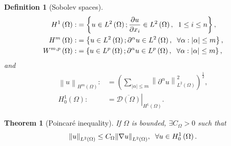 \documentclass[11pt,a4paper,center,notitlepage]{article}
\numberwithin{equation}{section}
\newtheorem{definition}{Definition}[section]
\newtheorem{theorem}{Theorem}[section]
\begin{document}
\begin{definition}[Sobolev spaces]
\begin{align}
{H^1}\left( \Omega  \right): &= \left\{ {u \in {L^2}\left( \Omega  \right);\frac{{\partial u}}{{\partial {x_i}}} \in {L^2}\left( \Omega  \right),\hspace{2mm}1 \le i \le n} \right\},\\
{H^m}\left( \Omega  \right): &= \left\{ {u \in {L^2}\left( \Omega  \right);{\partial ^\alpha }u \in {L^2}\left( \Omega  \right),\hspace{2mm}\forall \alpha :\left| \alpha  \right| \le m} \right\},\\
{W^{m,p}}\left( \Omega  \right):& = \left\{ {u \in {L^p}\left( \Omega  \right);{\partial ^\alpha }u \in {L^p}\left( \Omega  \right),\hspace{2mm}\forall \alpha :\left| \alpha  \right| \le m} \right\},
\end{align}
and
\begin{align}
{\left\| u \right\|_{{H^m}\left( \Omega  \right)}}: &= {\left( {\sum\limits_{\left| \alpha  \right| \le m} {\left\| {{\partial ^\alpha }u} \right\|_{{L^2}\left( \Omega  \right)}^2} } \right)^{\frac{1}{2}}},\\
H_0^1\left( \Omega  \right): &= {\left. {\overline {\mathcal{D}\left( \Omega  \right)} } \right|_{{H^1}\left( \Omega  \right)}}.
\end{align}
\end{definition}

\begin{theorem}[Poincar\'e inequality] 
If $\Omega$ is bounded, $\exists {C_\Omega } > 0$ such that 
\begin{align}
{\left\| u \right\|_{{L^2}\left( \Omega  \right)}} \le {C_\Omega }{\left\| {\nabla u} \right\|_{{L^2}\left( \Omega  \right)}},\hspace{2mm}\forall u \in H_0^1\left( \Omega  \right).
\end{align}
\end{theorem}
\end{document}
